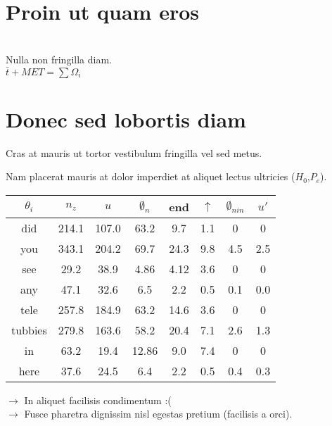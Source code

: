 
\printTitle

\printOutline

\section{Proin ut quam eros}

	\slideCentered
	{
		\\
		\bigskip
		Nulla non fringilla diam.\\
		$\bar{t}+MET = \sum \Omega_i$\\
	}

\section{Donec sed lobortis diam}

	\slide
	{
        \itemList{}
		{
			\item Cras at mauris ut tortor vestibulum fringilla vel sed metus.
			\item Nam placerat mauris at dolor imperdiet at aliquet lectus ultricies ($H_0$,$P_e$).
		}
		\centered
		{
	    \begin{tabular}{|c|ccccccc|}
			\hline
			  $\theta_i$ &  $n_{z}$  &  $u$   &   $\emptyset_n$    &   end   &  $\uparrow$    &   $\emptyset_{nin}$ & $u'$ \\
			\hline
			\hline
			 did  & 214.1  & 107.0  & 63.2  &  9.7    &  1.1   &  0   &  0  \\
			 you  & 343.1  & 204.2  & 69.7  &  24.3    &  9.8   &  4.5   &  2.5  \\
			\hline
			 see  &  29.2  &  38.9  & 4.86  &  4.12     &  3.6      &  0      &  0    \\
			 any  & 47.1  & 32.6  & 6.5  &  2.2    &  0.5   &  0.1   &  0.0  \\
			\hline
			\hline
			 tele  & 257.8  & 184.9  & 63.2  &  14.6    &  3.6   &  0    &  0  \\
			 tubbies  & 279.8  & 163.6  & 58.2  &  20.4    &  7.1    &  2.6    &  1.3  \\
			\hline
			 in  & 63.2   &  19.4  &  12.86     &  9.0      &  7.4      &  0      &  0    \\
			 here  & 37.6   &  24.5  &  6.4     &  2.2       &  0.5      &  0.4      &  0.3    \\
			\hline
		\end{tabular}
		}
		\bigskip
		$\rightarrow$ In aliquet facilisis condimentum :(\\
		$\rightarrow$ Fusce pharetra dignissim nisl egestas pretium (facilisis a orci).

	}

